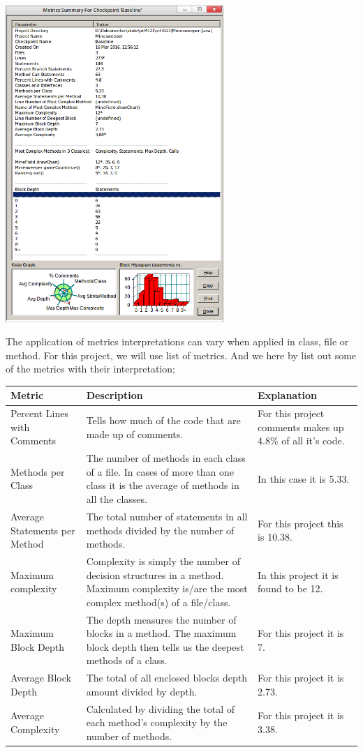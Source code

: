 \documentclass[UKenglish]{article}  %
\begin{document}
\includegraphics[height=12cm]{project-metrics-summary-original.png}

The application of metrics interpretations can vary when applied in class, file
or method. For this project, we will use list of metrics. And we here by list
out some of the metrics with their interpretation;

\begin{longtable}[H]{| m{1in} |  m{2in} | m{2in} |}
	\hline
	\textbf{Metric} & \textbf{Description} & \textbf{Explanation}\\
	\hline Percent Lines with Comments & Tells how much of the code that
	are made up of comments. & For this project comments makes up 4.8\% of
	all it's code.\\
	\hline Methods per Class & The number of methods in each class of a
	file. In cases of more than one class it is the average of methods in
	all the classes. & In this case it is 5.33.\\
	\hline Average Statements per Method & The total number of statements
	in all methods divided by the number of methods. & For this project this
	is 10.38.\\
	\hline Maximum complexity & Complexity is simply the number of decision
	structures in a method. Maximum complexity is/are the most complex
	method(s) of a file/class. & In this project it is found to be 12.\\
	\hline Maximum Block Depth & The depth measures the number of blocks
	in a method. The maximum block depth then tells us the deepest methods
	of a class. & For this project it is 7.\\
	\hline Average Block Depth & The total of all enclosed blocks depth amount
	divided by depth. & For this project it is 2.73.\\
	\hline Average Complexity & Calculated by dividing the total of each
	method’s complexity by the number of methods. & For this project it is
	3.38.\\
	\hline
\end{longtable}
\end{document}
